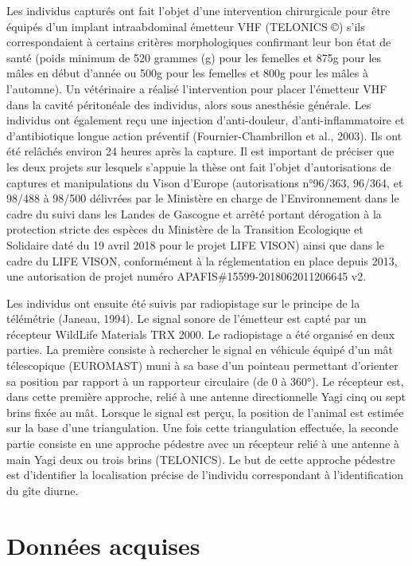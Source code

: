 \documentclass[
  letterpaper,
  DIV=11,
  numbers=noendperiod]{scrreprt}
\begin{document}
Les individus capturés ont fait l'objet d'une intervention chirurgicale
pour être équipés d'un implant intraabdominal émetteur VHF (TELONICS ©)
s'ils correspondaient à certains critères morphologiques confirmant leur
bon état de santé (poids minimum de 520 grammes (g) pour les femelles et
875g pour les mâles en début d'année ou 500g pour les femelles et 800g
pour les mâles à l'automne). Un vétérinaire a réalisé l'intervention
pour placer l'émetteur VHF dans la cavité péritonéale des individus,
alors sous anesthésie générale. Les individus ont également reçu une
injection d'anti-douleur, d'anti-inflammatoire et d'antibiotique longue
action préventif (Fournier-Chambrillon et al., 2003). Ils ont été
relâchés environ 24 heures après la capture. Il est important de
préciser que les deux projets sur lesquels s'appuie la thèse ont fait
l'objet d'autorisations de captures et manipulations du Vison d'Europe
(autorisations n°96/363, 96/364, et 98/488 à 98/500 délivrées par le
Ministère en charge de l'Environnement dans le cadre du suivi dans les
Landes de Gascogne et arrêté portant dérogation à la protection stricte
des espèces du Ministère de la Transition Ecologique et Solidaire daté
du 19 avril 2018 pour le projet LIFE VISON) ainsi que dans le cadre du
LIFE VISON, conformément à la réglementation en place depuis 2013, une
autorisation de projet numéro APAFIS\#15599-2018062011206645 v2.

Les individus ont ensuite été suivis par radiopistage sur le principe de
la télémétrie (Janeau, 1994). Le signal sonore de l'émetteur est capté
par un récepteur WildLife Materials TRX 2000. Le radiopistage a été
organisé en deux parties. La première consiste à rechercher le signal en
véhicule équipé d'un mât télescopique (EUROMAST) muni à sa base d'un
pointeau permettant d'orienter sa position par rapport à un rapporteur
circulaire (de 0 à 360°). Le récepteur est, dans cette première
approche, relié à une antenne directionnelle Yagi cinq ou sept brins
fixée au mât. Lorsque le signal est perçu, la position de l'animal est
estimée sur la base d'une triangulation. Une fois cette triangulation
effectuée, la seconde partie consiste en une approche pédestre avec un
récepteur relié à une antenne à main Yagi deux ou trois brins
(TELONICS). Le but de cette approche pédestre est d'identifier la
localisation précise de l'individu correspondant à l'identification du
gîte diurne.

\section{Données acquises}\label{donnuxe9es-acquises}
\end{document}
